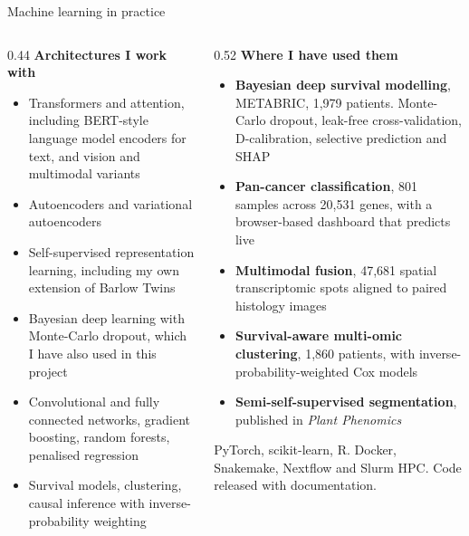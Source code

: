 \documentclass[aspectratio=169,11pt]{beamer}
\newcommand{\lead}[1]{{\color{seriesone}\bfseries #1}}
\newcommand{\point}[1]{{\color{seriestwo}\bfseries #1}}
\newcommand{\smallcap}[1]{{\footnotesize\color{inktwo}#1}}
\begin{document}
\begin{frame}{Machine learning in practice}
  \begin{columns}[T,onlytextwidth]
    \begin{column}{0.44\textwidth}
      \lead{Architectures I work with}
      \begin{itemize}\scriptsize
        \item Transformers and attention, including BERT-style language model
              encoders for text, and vision and multimodal variants
        \item Autoencoders and variational autoencoders
        \item Self-supervised representation learning, including my own
              extension of Barlow Twins
        \item Bayesian deep learning with Monte-Carlo dropout, which I have
              also used in this project
        \item Convolutional and fully connected networks, gradient boosting,
              random forests, penalised regression
        \item Survival models, clustering, causal inference with
              inverse-probability weighting
      \end{itemize}
    \end{column}
    \begin{column}{0.52\textwidth}
      \lead{Where I have used them}
      \begin{itemize}\scriptsize
        \item \point{Bayesian deep survival modelling}, METABRIC, 1{,}979
              patients. Monte-Carlo dropout, leak-free cross-validation,
              D-calibration, selective prediction and SHAP
        \item \point{Pan-cancer classification}, 801 samples across 20{,}531
              genes, with a browser-based dashboard that predicts live
        \item \point{Multimodal fusion}, 47{,}681 spatial transcriptomic spots
              aligned to paired histology images
        \item \point{Survival-aware multi-omic clustering}, 1{,}860 patients,
              with inverse-probability-weighted Cox models
        \item \point{Semi-self-supervised segmentation}, published in
              \emph{Plant Phenomics}
      \end{itemize}
      \vspace{1mm}
      \smallcap{PyTorch, scikit-learn, R. Docker, Snakemake, Nextflow and
      Slurm HPC. Code released with documentation.}
    \end{column}
  \end{columns}
\end{frame}
\end{document}
